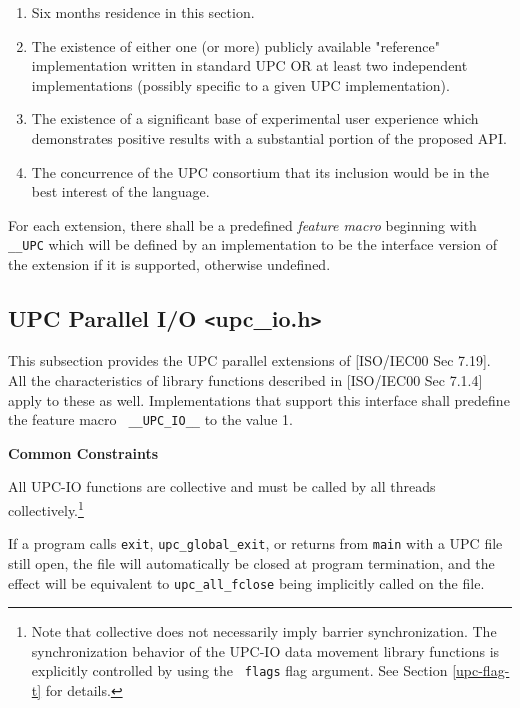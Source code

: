 \documentclass[12pt,titlepage]{article}
\newcounter{parnum}
\newcommand\np{\addtocounter{parnum}{1}\hspace{-2em}\makebox[2em][l]{\arabic{parnum}}}
\begin{document}
\begin{enumerate}
\item Six months residence in this section.

\item The existence of either one (or more) publicly available "reference" implementation 
written in standard UPC OR at least two independent implementations (possibly specific 
to a given UPC implementation).

\item The existence of a significant base of experimental user experience
   which demonstrates positive results with a substantial portion of the
   proposed API.

\item The concurrence of the UPC consortium that its inclusion would be
    in the best interest of the language.
\end{enumerate}

\np For each extension, there shall be a predefined {\em feature macro}
   beginning with {\tt \_\_UPC} which will be defined by an implementation
   to be the interface version of the extension if it is supported, otherwise
   undefined.

\pagebreak
\subsection{UPC Parallel I/O \texttt{<}upc\_io.h\texttt{>}}

\np This subsection provides the UPC parallel extensions of [ISO/IEC00 
    Sec 7.19].  All the characteristics of library functions described
    in [ISO/IEC00 Sec 7.1.4] apply to these as well.  Implementations
    that support this interface shall predefine the feature macro {\tt
    \_\_UPC\_IO\_\_} to the value 1.

{\bf Common Constraints}

\np All UPC-IO functions are collective and must be called by all threads collectively.\footnote{Note that 
collective does not necessarily imply barrier synchronization.  The synchronization behavior of the 
UPC-IO data movement library functions is explicitly controlled by using the {\tt
flags} flag argument. See Section \ref{upc-flag-t} for details.}

\np If a program calls {\tt exit}, {\tt upc\_global\_exit}, or returns from {\tt main} with a
UPC file still open, the file will automatically be closed at program
termination, and the effect will be equivalent to {\tt upc\_all\_fclose} being
implicitly called on the file.
\end{document}
